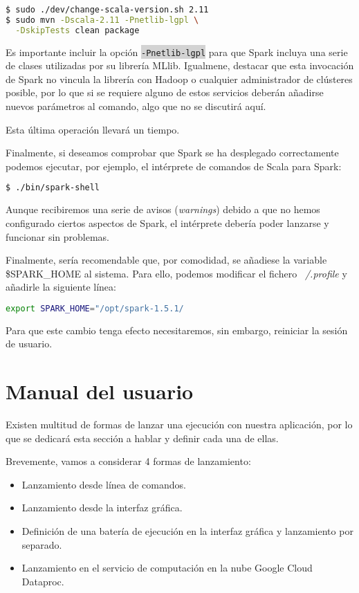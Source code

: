 \begin{lstlisting}[language=bash]
$ sudo ./dev/change-scala-version.sh 2.11
$ sudo mvn -Dscala-2.11 -Pnetlib-lgpl \
  -DskipTests clean package
\end{lstlisting}

Es importante incluir la opción \colorbox{lightgray}{\lstinline|-Pnetlib-lgpl|} para que Spark incluya una serie de clases utilizadas por su librería MLlib\cite{SparkDependencies}. Igualmene, destacar que esta invocación de Spark no vincula la librería con Hadoop o cualquier administrador de clústeres posible, por lo que si se requiere alguno de estos servicios deberán añadirse nuevos parámetros al comando, algo que no se discutirá aquí.

Esta última operación llevará un tiempo. 

Finalmente, si deseamos comprobar que Spark se ha desplegado correctamente podemos ejecutar, por ejemplo, el intérprete de comandos de Scala para Spark:

\begin{lstlisting}[language=bash]
$ ./bin/spark-shell
\end{lstlisting}

Aunque recibiremos una serie de avisos (\textit{warnings}) debido a que no hemos configurado ciertos aspectos de Spark, el intérprete debería poder lanzarse y funcionar sin problemas.

Finalmente, sería recomendable que, por comodidad, se añadiese la variable \$SPARK\_HOME al sistema. Para ello, podemos modificar el fichero \textit{~/.profile} y añadirle la siguiente línea:

\begin{lstlisting}[language=bash]
export SPARK_HOME="/opt/spark-1.5.1/
\end{lstlisting}

Para que este cambio tenga efecto necesitaremos, sin embargo, reiniciar la sesión de usuario.

\section{Manual del usuario}\label{sec:manualUsuario}

Existen multitud de formas de lanzar una ejecución con nuestra aplicación, por lo que se dedicará esta sección a hablar y definir cada una de ellas.

Brevemente, vamos a considerar 4 formas de lanzamiento:

\begin{itemize}
	\item Lanzamiento desde línea de comandos.
	\item Lanzamiento desde la interfaz gráfica.
	\item Definición de una batería de ejecución en la interfaz gráfica y lanzamiento por separado.
	\item Lanzamiento en el servicio de computación en la nube Google Cloud Dataproc.
\end{itemize}

